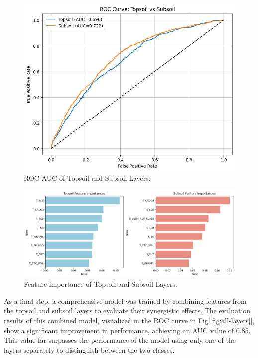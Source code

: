\begin{figure}[htbp]
    \centerline{\includegraphics[width=\linewidth]{fig7.png}}
    \caption{ROC-AUC of Topsoil and Subsoil Layers.}
    \label{fig:sub-top}
\end{figure}
\begin{figure}[htbp]
    \centerline{\includegraphics[width=\linewidth]{fig8.png}}
    \caption{Feature importance of Topsoil and Subsoil Layers.}
    \label{fig:feature-importance-top-sub}
\end{figure}

As a final step, a comprehensive model was trained by combining features from the topsoil and subsoil layers to evaluate their synergistic effects. The evaluation results of this combined model, visualized in the ROC curve in Fig[\ref{fig:all-layers}], show a significant improvement in performance, achieving an AUC value of 0.85. This value far surpasses the performance of the model using only one of the layers separately to distinguish between the two classes.

